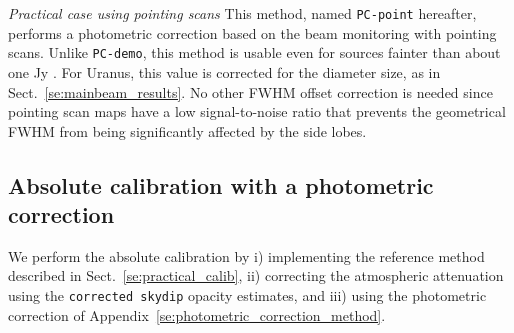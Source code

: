 \noindent \emph{Practical case using pointing scans} This method,
named {\tt PC-point} hereafter, performs a photometric correction based on the beam monitoring with
pointing scans. 
Unlike {\tt PC-demo}, this method is usable even for sources fainter than
about one Jy . For Uranus, this value is corrected for the diameter size, as in
Sect.~\ref{se:mainbeam_results}. No other FWHM offset correction is needed since
pointing scan maps have a low signal-to-noise ratio that prevents the
geometrical FWHM from being significantly affected by the side lobes.


\subsection{Absolute calibration with a photometric correction}

We perform the absolute calibration by i) implementing the reference
method described in Sect.~\ref{se:practical_calib}, ii) correcting the
atmospheric attenuation using the {\tt corrected skydip} opacity
estimates, and iii) using the photometric correction of
Appendix~\ref{se:photometric_correction_method}.


